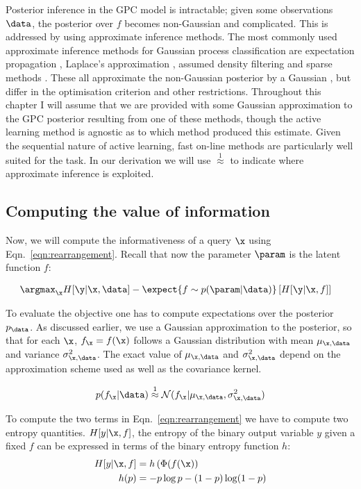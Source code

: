 Posterior inference in the GPC model is intractable; given some observations $\data$, the posterior over $f$ becomes non-Gaussian and complicated. This is addressed by using approximate inference methods. The most commonly used approximate inference methods for Gaussian process classification are expectation propagation \citep[EP,][]{Minka2002}, Laplace's approximation \citep{williams1998}, assumed density filtering \citep[ADF,][]{csato2000} and sparse methods \citep{candela05sparseGP}. These all approximate the non-Gaussian posterior by a Gaussian \citep{Nickisch2008}, but differ in the optimisation criterion and other restrictions. Throughout this chapter I will assume that we are provided with some Gaussian approximation to the GPC posterior resulting from one of these methods, though the active learning method is agnostic as to which method produced this estimate. Given the sequential nature of active learning, fast on-line methods \citep{Csato2002} are particularly well suited for the task. In our derivation we will use {\scriptsize$\stackrel{1}{\approx}$} to indicate where approximate inference is exploited.

\subsection{Computing the value of information}

Now, we will compute the informativeness of a query $\x$ using Eqn.\  \eqref{eqn:rearrangement}. Recall that now the parameter $\param$ is the latent function $f$:

\begin{align}
	&\argmax_{\x} H[\y \vert \x, \data] - \expect{f\sim p(\param|\data)} \left[ H[\y \vert \x,f] \right]
\end{align}

To evaluate the objective one has to compute expectations over the posterior $p_\data$. As discussed earlier, we use a Gaussian approximation to the posterior, so that for each $\x$, $f_{\x} = f(\x)$ follows a Gaussian distribution with mean $\mu_{\x,\data}$ and variance $\sigma_{\x,\data}^2$. The exact value of $\mu_{\x,\data}$ and $\sigma_{\x,\data}^2$ depend on the approximation scheme used as well as the covariance kernel.

\begin{align}
	p(f_{\x}\vert\data) \stackrel{1}{\approx} \mathcal{N}(f_{\x}\vert \mu_{\x,\data},\sigma_{\x,\data}^2) 
\end{align}

To compute the two terms in Eqn.\ \eqref{eqn:rearrangement} we have to compute two entropy quantities. $H[y\vert\x,f]$, the entropy of the binary output variable $y$ given a fixed $f$ can be expressed in terms of the binary entropy function $h$: 
\begin{align}
	H[y\vert\x,f] &= h\left(\Phi(f(\x)\right)\\
	h(p)	&=- p\log p - (1-p)\log(1-p)
\end{align}

